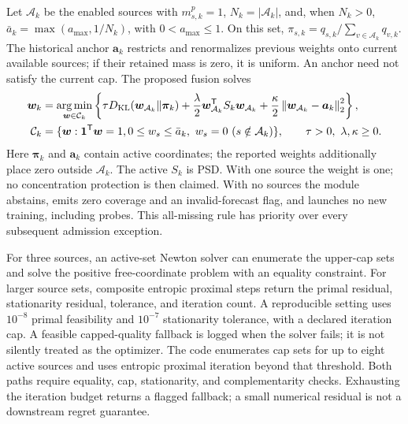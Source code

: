 \documentclass[10pt]{article}
\DeclareMathOperator*{\argmin}{arg\,min}
\newcommand{\norm}[1]{\left\lVert #1\right\rVert}
\begin{document}
Let $\mathcal A_k$ be the enabled sources with $m^p_{s,k}=1$, $N_k=|\mathcal A_k|$, and, when $N_k>0$,
$\bar a_k=\max(a_{\max},1/N_k)$, with $0<a_{\max}\le1$. On this set,
$\pi_{s,k}=q_{s,k}/\sum_{v\in\mathcal A_k}q_{v,k}$.
The historical anchor $\boldsymbol a_k$ restricts and renormalizes previous
weights onto current available sources; if their retained mass is zero, it is
uniform. An anchor need not satisfy the current cap. The proposed fusion solves
\begin{align}
 \boldsymbol w_k&=\argmin_{\boldsymbol w\in\mathcal C_k}
 \left\{\tau D_{\rm KL}(\boldsymbol w_{\mathcal A_k}\Vert\boldsymbol\pi_k)
       +\frac\lambda2\boldsymbol w_{\mathcal A_k}^{\mathsf T}
                    S_k\boldsymbol w_{\mathcal A_k}
       +\frac\kappa2\norm{\boldsymbol w_{\mathcal A_k}-\boldsymbol a_k}_2^2\right\},
 \label{eq:main-fusion}\\
 \mathcal C_k&=\{\boldsymbol w:\boldsymbol1^{\mathsf T}\boldsymbol w=1,
   0\le w_s\le\bar a_k,\ w_s=0\ (s\notin\mathcal A_k)\},
 \qquad \tau>0,\ \lambda,\kappa\ge0.
\end{align}
Here $\boldsymbol\pi_k$ and $\boldsymbol a_k$ contain active coordinates;
the reported weights additionally place zero outside $\mathcal A_k$.
The active $S_k$ is PSD. With one source the
weight is one; no concentration protection is then claimed. With no sources
the module abstains, emits zero coverage and an invalid-forecast flag, and
launches no new training, including probes. This all-missing rule has
priority over every subsequent admission exception.

For three sources, an active-set Newton solver can enumerate the upper-cap
sets and solve the positive free-coordinate problem with an equality constraint.
For larger source sets, composite entropic proximal steps return the primal residual,
stationarity residual, tolerance, and iteration count. A reproducible setting
uses $10^{-8}$ primal feasibility and $10^{-7}$ stationarity tolerance, with
a declared iteration cap. A feasible capped-quality fallback is logged when
the solver fails; it is not silently treated as the optimizer.
The code enumerates cap sets for up to eight active sources and uses entropic
proximal iteration beyond that threshold. Both paths require equality, cap,
stationarity, and complementarity checks. Exhausting the iteration budget
returns a flagged fallback; a small numerical residual is not a downstream
regret guarantee.
\end{document}
